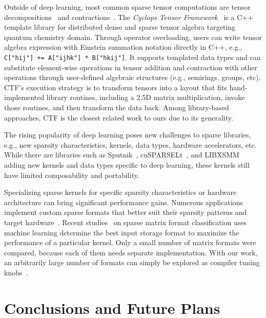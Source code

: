 \documentclass[10pt]{article}
\begin{document}
Outside of deep learning, most common sparse tensor computations are tensor decompositions~\cite{kolda2009tensor-decomposition} and contractions~\cite{parkhill2010sparse-contraction, kats2013sparse-contraction}. The \emph{Cyclops Tensor Framework}~\cite{solomonik2013ctf, solomonik2015sparse-ctf} is a C++ template library for distributed dense and sparse tensor algebra targeting quantum chemistry domain. Through operator overloading, users can write tensor algebra expression with Einstein summation notation directly in C++, e.g., \texttt{C["hij"] += A["ijhk"] * B["hkij"]}. It supports templated data types and can substitute element-wise operations in tensor addition and contraction with other operations through user-defined algebraic structures (e.g., semirings, groups, etc). CTF's execution strategy is to transform tensors into a layout that fits hand-implemented library routines, including a 2.5D matrix multiplication, invoke those routines, and then transform the data back. Among library-based approaches, CTF is the closest related work to ours due to its generality.

The rising popularity of deep learning poses new challenges to sparse libraries, e.g., new sparsity characteristics, kernels, data types, hardware accelerators, etc. While there are libraries such as Sputnik~\cite{gale2020sputnik}, cuSPARSELt~\cite{nvidia2021cusparselt}, and LIBXSMM~\cite{heinecke2016libxsmm} adding new kernels and data types specific to deep learning, these kernels still have limited composability and portability. 

Specializing sparse kernels for specific sparsity characteristics or hardware architecture can bring significant performance gains. Numerous applications implement custom sparse formats that better suit their sparsity patterns and target hardware~\cite{sato1963,tinney,buluc2008,itpack,rice1985,saad2003,buluc2009,smith2015a,li2018hicoo}. Recent studies~\cite{zhao2018spmv-format,pichel2019classification,xie2019ia-spgemm} on sparse matrix format classification uses machine learning determine the best input storage format to maximize the performance of a particular kernel. Only a small number of matrix formats were compared, because each of them needs separate implementation. With our work, an arbitrarily large number of formats can simply be explored as compiler tuning knobs~\cite{gus}.

\section{Conclusions and Future Plans}
\label{conclusions}
\end{document}
